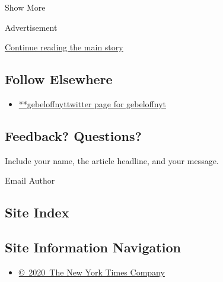Show More

Advertisement

\protect\hyperlink{after-mid2}{Continue reading the main story}

\hypertarget{follow-elsewhere}{%
\subsection{Follow Elsewhere}\label{follow-elsewhere}}

\begin{itemize}
\tightlist
\item
  \href{https://twitter.com/gebeloffnyt}{**gebeloffnyttwitter page for
  gebeloffnyt}
\end{itemize}

\hypertarget{feedback-questions}{%
\subsection{Feedback? Questions?}\label{feedback-questions}}

Include your name, the article headline, and your message.

Email Author

\hypertarget{site-index}{%
\subsection{Site Index}\label{site-index}}

\hypertarget{site-information-navigation}{%
\subsection{Site Information
Navigation}\label{site-information-navigation}}

\begin{itemize}
\tightlist
\item
  \href{https://help.nytimes3xbfgragh.onion/hc/en-us/articles/115014792127-Copyright-notice}{©~2020~The
  New York Times Company}
\end{itemize}

